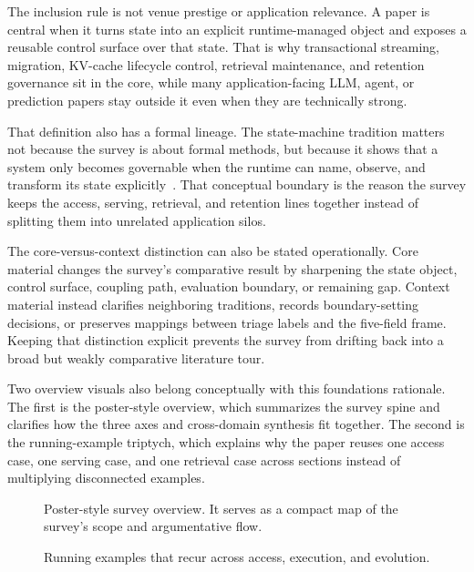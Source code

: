 The inclusion rule is not venue prestige or application relevance. A paper is central when it turns state into an explicit runtime-managed object and exposes a reusable control surface over that state. That is why transactional streaming, migration, KV-cache lifecycle control, retrieval maintenance, and retention governance sit in the core, while many application-facing LLM, agent, or prediction papers stay outside it even when they are technically strong.

That definition also has a formal lineage. The state-machine tradition matters not because the survey is about formal methods, but because it shows that a system only becomes governable when the runtime can name, observe, and transform its state explicitly~\cite{schneider1990state}. That conceptual boundary is the reason the survey keeps the access, serving, retrieval, and retention lines together instead of splitting them into unrelated application silos.

The core-versus-context distinction can also be stated operationally. Core material changes the survey's comparative result by sharpening the state object, control surface, coupling path, evaluation boundary, or remaining gap. Context material instead clarifies neighboring traditions, records boundary-setting decisions, or preserves mappings between triage labels and the five-field frame. Keeping that distinction explicit prevents the survey from drifting back into a broad but weakly comparative literature tour.

Two overview visuals also belong conceptually with this foundations rationale. The first is the poster-style overview, which summarizes the survey spine and clarifies how the three axes and cross-domain synthesis fit together. The second is the running-example triptych, which explains why the paper reuses one access case, one serving case, and one retrieval case across sections instead of multiplying disconnected examples.

\begin{figure}[tbp]
\centering
\resizebox{0.9\linewidth}{!}{}
\caption{Poster-style survey overview. It serves as a compact map of the survey's scope and argumentative flow.}
\label{fig:supp-poster-overview}
\end{figure}

\begin{figure}[tbp]
\centering
\resizebox{0.96\linewidth}{!}{}
\caption{Running examples that recur across access, execution, and evolution.}
\label{fig:supp-running-examples}
\end{figure}
